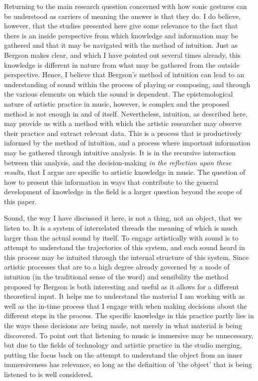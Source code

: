 \documentclass[11pt]{article}
\begin{document}
Returning to the main research question concerned with how sonic gestures can be understood as carriers of meaning the answer is that they do.
I do believe, however, that the studies presented here give some relevance to the fact that there is an inside perspective from which knowledge and information may be gathered and that it may be navigated with the method of intuition.
Just as Bergson makes clear, and which I have pointed out several times already, this knowledge is different in nature from what may be gathered from the outside perspective.
Hence, I believe that Bergson's method of intuition can lead to an understanding of sound within the process of playing or composing, and through the various elements on which the sound is dependent.
The epistemological nature of artistic practice in music, however, is complex and the proposed method is not enough in and of itself.
Nevertheless, intuition, as described here, may provide us with a method with which the artistic researcher may observe their  practice and extract relevant data.
This is a process that is productively informed by the method of intuition, and a process where important information may be gathered through intuitive analysis.
It is in the recursive interaction between this analysis, and the decision-making \emph{in the reflection upon these results}, that I argue are specific to artistic knowledge in music.
The question of how to present this information in ways that contribute to the general development of knowledge in the field is a larger question beyond the scope of this paper.

Sound, the way I have discussed it here, is not a thing, not an object, that we listen to.
It is a system of interrelated threads the meaning of which is much larger than the actual sound by itself. To engage artistically with sound is to attempt to understand the trajectories of this system, and each sound heard in this process may be intuited through the internal structure of this system.
Since artistic processes that are to a high degree already governed by a mode of intuition (in the traditional sense of the word) and sensibility the method proposed by Bergson is both interesting and useful as it allows for a different theoretical input.
It helps me to understand the material I am working with as well as the in-time process that I engage with when making decisions about the different steps in the process. The specific knowledge in this practice partly lies in the ways these decisions are being made, not merely in what material is being discovered.
To point out that listening to music is immersive may be unnecessary, but due to the fields of technology and artistic practice in the studio merging, putting the focus back on the attempt to understand the object from an inner immersiveness has relevance, so long as the definition of 'the object' that is being listened to is well considered.
\end{document}
